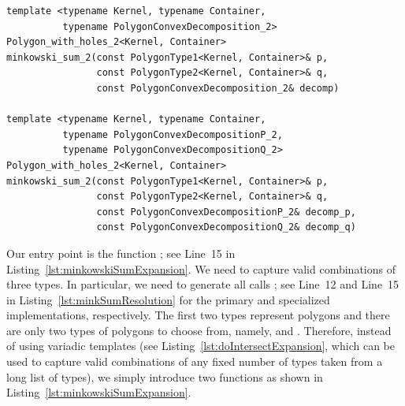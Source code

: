 \begin{lstfloat}
  \begin{lstlisting}[style=cppframedStyle,basicstyle=\normalsize,%
                     label={lst:minkSumConvexDecomposition},%
                     caption={Signatures of function templates that compute the 2D Minkwoski sum using the convex-decomposition approach.}]
template <typename Kernel, typename Container,
          typename PolygonConvexDecomposition_2>
Polygon_with_holes_2<Kernel, Container>
minkowski_sum_2(const PolygonType1<Kernel, Container>& p,
                const PolygonType2<Kernel, Container>& q,
                const PolygonConvexDecomposition_2& decomp)

template <typename Kernel, typename Container,
          typename PolygonConvexDecompositionP_2,
          typename PolygonConvexDecompositionQ_2>
Polygon_with_holes_2<Kernel, Container>
minkowski_sum_2(const PolygonType1<Kernel, Container>& p,
                const PolygonType2<Kernel, Container>& q,
                const PolygonConvexDecompositionP_2& decomp_p,
                const PolygonConvexDecompositionQ_2& decomp_q)
  \end{lstlisting}
\end{lstfloat}

Our entry point is the function ;
see Line~15 in Listing~\ref{lst:minkowskiSumExpansion}. We need to 
capture valid combinations of three types. In particular, we need to
generate all calls ; 
see Line~12 and Line~15 in Listing~\ref{lst:minkSumResolution} for the 
primary and specialized implementations, respectively. The first two
types represent polygons and there are only two types of polygons to 
choose from, namely,  and 
. Therefore, instead of using 
variadic templates (see Listing~\ref{lst:doIntersectExpansion}, which
can be used to capture valid combinations of any fixed number of types
taken from a long list of types), we simply introduce two functions as
shown in Listing~\ref{lst:minkowskiSumExpansion}.

